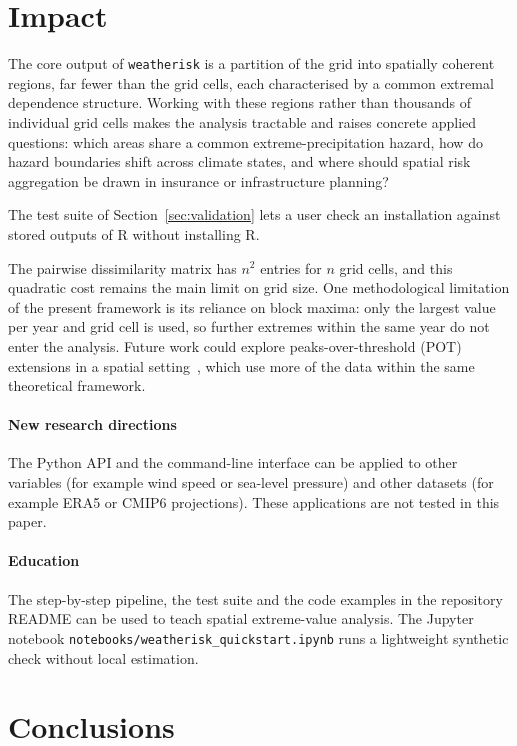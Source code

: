 \documentclass[preprint,12pt,a4paper]{elsarticle}
\begin{document}
\FloatBarrier

\section{Impact}
\label{sec:impact}

The core output of \texttt{weatherisk} is a partition of the
grid into spatially coherent regions, far fewer than the grid cells, each characterised by a common extremal
dependence structure. Working with these regions rather than
thousands of individual grid cells makes the analysis tractable and
raises concrete applied questions: which areas share a common
extreme-precipitation hazard, how do hazard boundaries shift across
climate states, and where should spatial risk aggregation be drawn
in insurance or infrastructure planning?

The test suite of Section~\ref{sec:validation} lets a user check an
installation against stored outputs of R without installing R.

The pairwise dissimilarity matrix has $n^2$ entries for $n$
grid cells, and this quadratic cost remains the main limit on grid
size.
One methodological limitation of the present framework is
its reliance on block maxima: only the largest value per year
and grid cell is used, so further extremes within the same year do
not enter the analysis. Future work could explore peaks-over-threshold
(POT) extensions in a spatial setting~\cite{davison2012}, which use
more of the data within the same theoretical framework.

\paragraph{New research directions}
The Python API and the command-line interface can be applied to
other variables (for example wind speed or sea-level pressure) and
other datasets (for example ERA5 or CMIP6 projections). These
applications are not tested in this paper.

\paragraph{Education}
The step-by-step pipeline, the test suite and the code examples in
the repository README can be used to teach spatial extreme-value
analysis. The Jupyter notebook
\texttt{notebooks/\allowbreak weatherisk\_quickstart.ipynb} runs a
lightweight synthetic check without local estimation.

\section{Conclusions}
\label{sec:conclusions}
\end{document}
